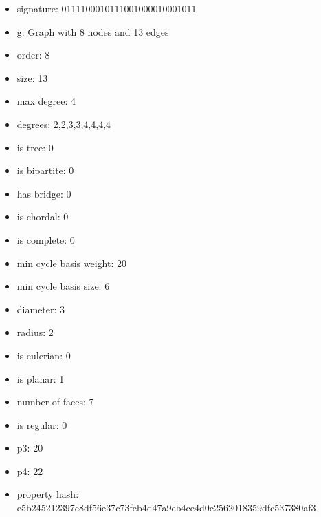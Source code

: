 \begin{itemize}
\item signature: 0111100010111001000010001011
\item g: Graph with 8 nodes and 13 edges
\item order: 8
\item size: 13
\item max degree: 4
\item degrees: 2,2,3,3,4,4,4,4
\item is tree: 0
\item is bipartite: 0
\item has bridge: 0
\item is chordal: 0
\item is complete: 0
\item min cycle basis weight: 20
\item min cycle basis size: 6
\item diameter: 3
\item radius: 2
\item is eulerian: 0
\item is planar: 1
\item number of faces: 7
\item is regular: 0
\item p3: 20
\item p4: 22
\item property hash: e5b245212397c8df56e37c73feb4d47a9eb4ce4d0c2562018359dfc537380af3
\end{itemize}
\newpage
\begin{figure}
\end{figure}
